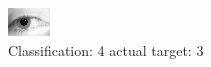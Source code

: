 \begin{figure}[h!]
\begin{center}
\includegraphics[width=0.60\columnwidth]{figures/ID1325_class_4_target_3.png}
\end{center}
\caption{ Classification: 4 actual target: 3}
\label{fig:ID1325_class_4_target_3}
\end{figure}
